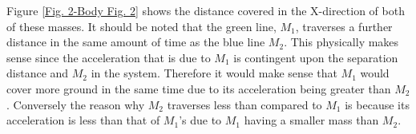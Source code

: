 \documentclass[twocolumn]{article}
\begin{document}
\par \noindent
Figure \ref{Fig. 2-Body Fig. 2} shows the distance covered in the X-direction of both of these masses. It should be noted that the green line, $M_1$, traverses a further distance in the same amount of time as the blue line $M_2$. This physically makes sense since the acceleration that is due to $M_1$ is contingent upon the separation distance and $M_2$ in the system. Therefore it would make sense that $M_1$ would cover more ground in the same time due to its acceleration being greater than $M_2$. Conversely the reason why $M_2$ traverses less than compared to $M_1$ is because its acceleration is less than that of $M_1$'s due to $M_1$ having a smaller mass than $M_2$.
\end{document}
